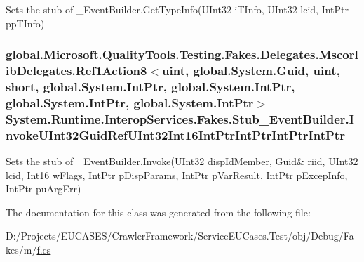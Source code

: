 Sets the stub of \-\_\-\-Event\-Builder.\-Get\-Type\-Info(\-U\-Int32 i\-T\-Info, U\-Int32 lcid, Int\-Ptr pp\-T\-Info)

\hypertarget{class_system_1_1_runtime_1_1_interop_services_1_1_fakes_1_1_stub___event_builder_ab8a7051b71caf2ce37e6c3c2c4d0fa77}{
\subsubsection[{Invoke\-U\-Int32\-Guid\-Ref\-U\-Int32\-Int16\-Int\-Ptr\-Int\-Ptr\-Int\-Ptr\-Int\-Ptr}]{\setlength{\rightskip}{0pt plus 5cm}global.\-Microsoft.\-Quality\-Tools.\-Testing.\-Fakes.\-Delegates.\-Mscorlib\-Delegates.\-Ref1\-Action8$<$uint, global.\-System.\-Guid, uint, short, global.\-System.\-Int\-Ptr, global.\-System.\-Int\-Ptr, global.\-System.\-Int\-Ptr, global.\-System.\-Int\-Ptr$>$ System.\-Runtime.\-Interop\-Services.\-Fakes.\-Stub\-\_\-\-Event\-Builder.\-Invoke\-U\-Int32\-Guid\-Ref\-U\-Int32\-Int16\-Int\-Ptr\-Int\-Ptr\-Int\-Ptr\-Int\-Ptr}}\label{class_system_1_1_runtime_1_1_interop_services_1_1_fakes_1_1_stub___event_builder_ab8a7051b71caf2ce37e6c3c2c4d0fa77}


Sets the stub of \-\_\-\-Event\-Builder.\-Invoke(U\-Int32 disp\-Id\-Member, Guid\& riid, U\-Int32 lcid, Int16 w\-Flags, Int\-Ptr p\-Disp\-Params, Int\-Ptr p\-Var\-Result, Int\-Ptr p\-Excep\-Info, Int\-Ptr pu\-Arg\-Err)



The documentation for this class was generated from the following file\-:\begin{DoxyCompactItemize}
\item 
D\-:/\-Projects/\-E\-U\-C\-A\-S\-E\-S/\-Crawler\-Framework/\-Service\-E\-U\-Cases.\-Test/obj/\-Debug/\-Fakes/m/\hyperlink{m_2f_8cs}{f.\-cs}\end{DoxyCompactItemize}
